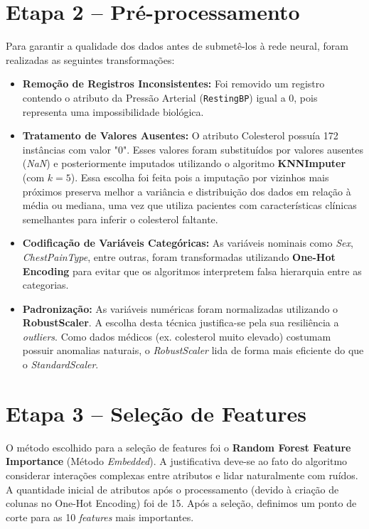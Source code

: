 \documentclass[12pt,a4paper]{article}
\begin{document}
\section{Etapa 2 -- Pré-processamento}
Para garantir a qualidade dos dados antes de submetê-los à rede neural, foram realizadas as seguintes transformações:
\begin{itemize}
    \item \textbf{Remoção de Registros Inconsistentes:} Foi removido um registro contendo o atributo da Pressão Arterial (\texttt{RestingBP}) igual a 0, pois representa uma impossibilidade biológica.
    \item \textbf{Tratamento de Valores Ausentes:} O atributo Colesterol possuía 172 instâncias com valor "0". Esses valores foram substituídos por valores ausentes (\textit{NaN}) e posteriormente imputados utilizando o algoritmo \textbf{KNNImputer} (com $k=5$). Essa escolha foi feita pois a imputação por vizinhos mais próximos preserva melhor a variância e distribuição dos dados em relação à média ou mediana, uma vez que utiliza pacientes com características clínicas semelhantes para inferir o colesterol faltante.
    \item \textbf{Codificação de Variáveis Categóricas:} As variáveis nominais como \textit{Sex}, \textit{ChestPainType}, entre outras, foram transformadas utilizando \textbf{One-Hot Encoding} para evitar que os algoritmos interpretem falsa hierarquia entre as categorias.
    \item \textbf{Padronização:} As variáveis numéricas foram normalizadas utilizando o \textbf{RobustScaler}. A escolha desta técnica justifica-se pela sua resiliência a \textit{outliers}. Como dados médicos (ex. colesterol muito elevado) costumam possuir anomalias naturais, o \textit{RobustScaler} lida de forma mais eficiente do que o \textit{StandardScaler}.
\end{itemize}

\section{Etapa 3 -- Seleção de Features}
O método escolhido para a seleção de features foi o \textbf{Random Forest Feature Importance} (Método \textit{Embedded}). A justificativa deve-se ao fato do algoritmo considerar interações complexas entre atributos e lidar naturalmente com ruídos. 
A quantidade inicial de atributos após o processamento (devido à criação de colunas no One-Hot Encoding) foi de 15. Após a seleção, definimos um ponto de corte para as 10 \textit{features} mais importantes.
\end{document}
